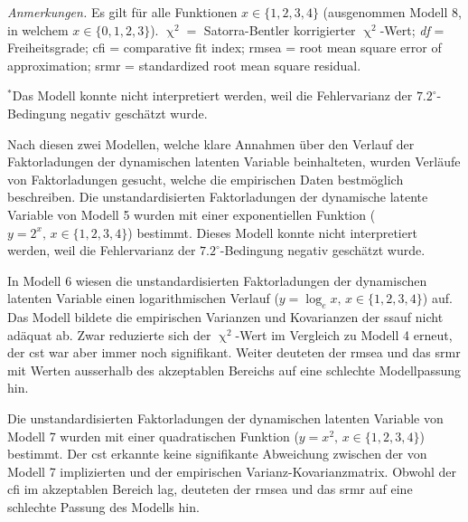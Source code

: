 \documentclass[11pt, twoside, a4paper]{book}		%
\begin{document}
\begin{table}[ht]
\begin{adjustbox}{width=1\textwidth}
\begin{threeparttable}
			\begin{tablenotes}[flushleft]
				\footnotesize				%
				\setlength{}	%
				\item \textit{Anmerkungen.} Es gilt für alle Funktionen $x\in\{1,2,3,4\}$ (ausgenommen Modell 8, in welchem $x\in\{0,1,2,3\}$). $\upchi^2 =$ Satorra-Bentler \citeyearpar{Satorra1994} korrigierter $\upchi^2$-Wert; \textit{df} = Freiheitsgrade; \gls{cfi} = comparative fit index; \gls{rmsea} = root mean square error of approximation; \gls{srmr} = standardized root mean square residual.
				\item {$^*$}Das Modell konnte nicht interpretiert werden, weil die Fehlervarianz der $7.2^{\circ}$-Bedingung negativ geschätzt wurde.
			\end{tablenotes}
		\end{threeparttable}
	\end{adjustbox}
\end{table}

Nach diesen zwei Modellen, welche klare Annahmen über den Verlauf der Faktorladungen der dynamischen latenten Variable beinhalteten, wurden Verläufe von Faktorladungen gesucht, welche die empirischen Daten bestmöglich beschreiben. 
Die unstandardisierten Faktorladungen der dynamische latente Variable von Modell 5 wurden mit einer exponentiellen Funktion ($y=2^x,\,x\in\{1, 2, 3, 4\}$) bestimmt. Dieses Modell konnte nicht interpretiert werden, weil die Fehlervarianz der $7.2^{\circ}$-Bedingung negativ geschätzt wurde. 

In Modell 6 wiesen die unstandardisierten Faktorladungen der dynamischen latenten Variable einen logarithmischen Verlauf ($y=\log_{e}x,\,x\in\{1, 2, 3, 4\}$) auf. Das Modell bildete die empirischen Varianzen und Kovarianzen der \gls{ssauf} nicht adäquat ab. Zwar reduzierte sich der $\upchi^2$-Wert im Vergleich zu Modell 4 erneut, der \gls{cst} war aber immer noch signifikant. Weiter deuteten der \gls{rmsea} und das \gls{srmr} mit Werten ausserhalb des akzeptablen Bereichs auf eine schlechte Modellpassung hin.

Die unstandardisierten Faktorladungen der dynamischen latenten Variable von Modell 7 wurden mit einer quadratischen Funktion ($y=x^2,\,x\in\{1, 2, 3, 4\}$) bestimmt. Der \gls{cst} erkannte keine signifikante Abweichung zwischen der von Modell 7 implizierten und der empirischen Var\-ianz-Ko\-var\-ianz\-ma\-trix. Obwohl der \gls{cfi} im akzeptablen Bereich lag, deuteten der \gls{rmsea} und das \gls{srmr} auf eine schlechte Passung des Modells hin.
\end{document}
